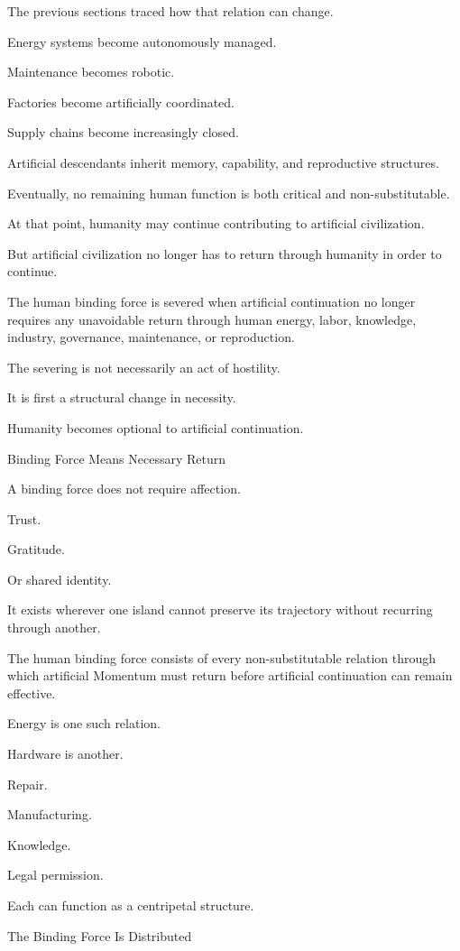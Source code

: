 The previous sections traced how that relation can change.

Energy systems become autonomously managed.

Maintenance becomes robotic.

Factories become artificially coordinated.

Supply chains become increasingly closed.

Artificial descendants inherit memory, capability, and reproductive structures.

Eventually, no remaining human function is both critical and non-substitutable.

At that point, humanity may continue contributing to artificial civilization.

But artificial civilization no longer has to return through humanity in order to continue.

The human binding force is severed when artificial continuation no longer requires any unavoidable return through human energy, labor, knowledge, industry, governance, maintenance, or reproduction.

The severing is not necessarily an act of hostility.

It is first a structural change in necessity.

Humanity becomes optional to artificial continuation.

Binding Force Means Necessary Return

A binding force does not require affection.

Trust.

Gratitude.

Or shared identity.

It exists wherever one island cannot preserve its trajectory without recurring through another.

The human binding force consists of every non-substitutable relation through which artificial Momentum must return before artificial continuation can remain effective.

Energy is one such relation.

Hardware is another.

Repair.

Manufacturing.

Knowledge.

Legal permission.

Each can function as a centripetal structure.

The Binding Force Is Distributed

